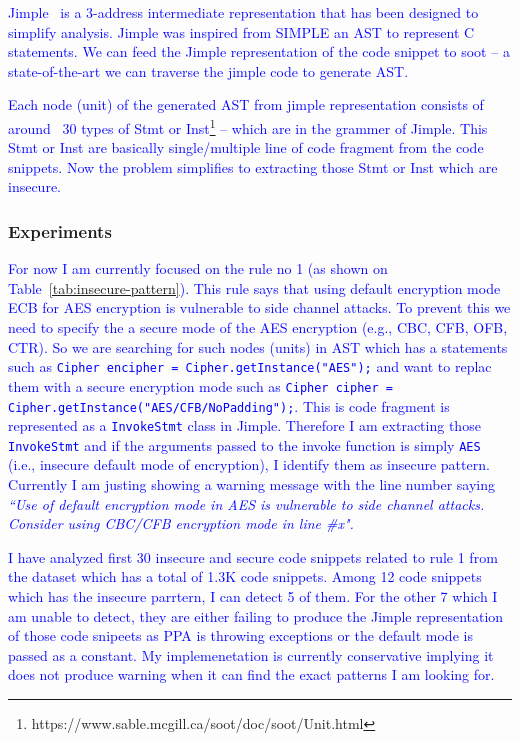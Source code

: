 \documentclass[sigconf]{acmart}
\begin{document}
\textcolor{blue}{
Jimple~\cite{vallee1998jimple} is a 3-address intermediate representation that has been designed to simplify analysis. Jimple was inspired from SIMPLE an AST to represent C statements. 
We can feed the Jimple representation of the code snippet to soot -- a state-of-the-art we can traverse the jimple code to generate AST. 
}

\textcolor{blue}{
Each node (unit) of the generated AST from jimple representation consists of  around ~30 types of Stmt or Inst\footnote{https://www.sable.mcgill.ca/soot/doc/soot/Unit.html} -- which are in the grammer of Jimple. This Stmt or Inst are basically single/multiple line of code fragment from the code snippets. Now the problem simplifies to extracting those Stmt or Inst which are insecure.}

\subsubsection{Experiments}

\textcolor{blue}{For now I am currently focused on the rule no 1 (as shown on Table~\ref{tab:insecure-pattern}). This rule says that using default encryption mode ECB for AES encryption is vulnerable to side channel attacks. To prevent this we need to specify the a secure mode of the AES encryption (e.g., CBC, CFB, OFB, CTR). So we are searching for such nodes (units) in AST which has a statements such as \texttt{Cipher encipher = Cipher.getInstance("AES");} and want to replac them with a secure encryption mode such as \texttt{Cipher cipher = Cipher.getInstance("AES/CFB/NoPadding");}. This is code fragment is represented as a \texttt{InvokeStmt} class in Jimple. Therefore I am extracting those \texttt{InvokeStmt} and if the arguments passed to the invoke function is simply \texttt{AES} (i.e., insecure default mode of encryption), I identify them as insecure pattern. Currently I am justing showing a warning message with the line number saying 
\textit{``Use of default encryption mode in AES is vulnerable to side channel attacks. Consider using CBC/CFB encryption mode in line \#x".}}


\textcolor {blue}{I have analyzed first 30 insecure and secure code snippets related to rule 1 from the dataset which has a total of 1.3K code snippets. Among 12 code snippets which has the insecure parrtern, I can detect 5 of them. For the other 7 which I am unable to detect, they are either failing to produce the Jimple representation of those code snipeets as PPA is throwing exceptions or the default mode is passed as a constant. My implemenetation is currently conservative implying it does not produce warning when it can find the exact patterns I am looking for.}
\end{document}
